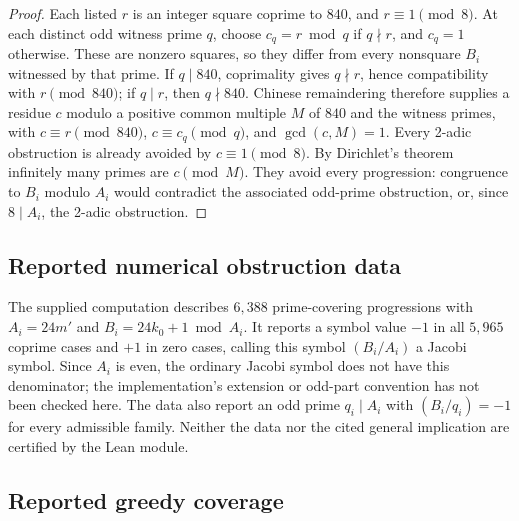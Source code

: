 \documentclass[11pt,a4paper]{article}
\theoremstyle{definition}
\begin{document}
\begin{proof}
  Each listed $r$ is an integer square coprime to $840$, and
  $r\equiv1\pmod8$. At each distinct odd witness prime $q$, choose
  $c_q=r\bmod q$ if $q\nmid r$, and $c_q=1$ otherwise. These are
  nonzero squares, so they differ from every nonsquare $B_i$ witnessed
  by that prime. If $q\mid840$, coprimality gives $q\nmid r$, hence
  compatibility with $r\pmod{840}$; if $q\mid r$, then $q\nmid840$.
  Chinese remaindering therefore supplies a residue $c$ modulo a
  positive common multiple $M$ of $840$ and the witness primes, with
  $c\equiv r\pmod{840}$, $c\equiv c_q\pmod q$, and $\gcd(c,M)=1$.
  Every 2-adic obstruction is already avoided by $c\equiv1\pmod8$.
  By Dirichlet's theorem infinitely many primes are $c\pmod M$.
  They avoid every progression: congruence to $B_i$ modulo $A_i$
  would contradict the associated odd-prime obstruction, or, since
  $8\mid A_i$, the 2-adic obstruction.
\end{proof}

\subsection{Reported numerical obstruction data}

The supplied computation describes $6{,}388$ prime-covering progressions
with $A_i=24m'$ and $B_i=24k_0+1\bmod A_i$. It reports a symbol value
$-1$ in all $5{,}965$ coprime cases and $+1$ in zero cases, calling this
symbol $(B_i/A_i)$ a Jacobi symbol. Since $A_i$ is even, the ordinary
Jacobi symbol does not have this denominator; the implementation's
extension or odd-part convention has not been checked here. The data
also report an odd prime $q_i\mid A_i$ with $(B_i/q_i)=-1$ for every
admissible family. Neither the data nor the cited general implication
are certified by the Lean module.

\subsection{Reported greedy coverage}
\end{document}
